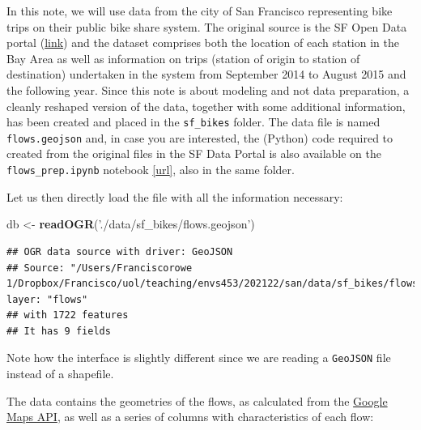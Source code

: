 \documentclass[
]{book}
\newenvironment{Shaded}{\begin{snugshade}}{\end{snugshade}}
\newcommand{\KeywordTok}[1]{\textcolor[rgb]{0.13,0.29,0.53}{\textbf{#1}}}
\newcommand{\NormalTok}[1]{#1}
\newcommand{\OperatorTok}[1]{\textcolor[rgb]{0.81,0.36,0.00}{\textbf{#1}}}
\newcommand{\OtherTok}[1]{\textcolor[rgb]{0.56,0.35,0.01}{#1}}
\newcommand{\StringTok}[1]{\textcolor[rgb]{0.31,0.60,0.02}{#1}}
\begin{document}
In this note, we will use data from the city of San Francisco representing bike trips on their public bike share system. The original source is the SF Open Data portal (\href{http://www.bayareabikeshare.com/open-data}{link}) and the dataset comprises both the location of each station in the Bay Area as well as information on trips (station of origin to station of destination) undertaken in the system from September 2014 to August 2015 and the following year. Since this note is about modeling and not data preparation, a cleanly reshaped version of the data, together with some additional information, has been created and placed in the \texttt{sf\_bikes} folder. The data file is named \texttt{flows.geojson} and, in case you are interested, the (Python) code required to created from the original files in the SF Data Portal is also available on the \texttt{flows\_prep.ipynb} notebook \href{https://github.com/darribas/spa_notes/blob/master/sf_bikes/flows_prep.ipynb}{{[}url{]}}, also in the same folder.

Let us then directly load the file with all the information necessary:

\begin{Shaded}
\begin{Highlighting}[]
\NormalTok{db <-}\StringTok{ }\KeywordTok{readOGR}\NormalTok{(}\StringTok{'./data/sf_bikes/flows.geojson'}\NormalTok{)}
\end{Highlighting}
\end{Shaded}

\begin{verbatim}
## OGR data source with driver: GeoJSON 
## Source: "/Users/Franciscorowe 1/Dropbox/Francisco/uol/teaching/envs453/202122/san/data/sf_bikes/flows.geojson", layer: "flows"
## with 1722 features
## It has 9 fields
\end{verbatim}

\begin{Shaded}
\end{Shaded}

Note how the interface is slightly different since we are reading a \texttt{GeoJSON} file instead of a shapefile.

The data contains the geometries of the flows, as calculated from the \href{https://developers.google.com/maps/}{Google Maps API}, as well as a series of columns with characteristics of each flow:
\end{document}
